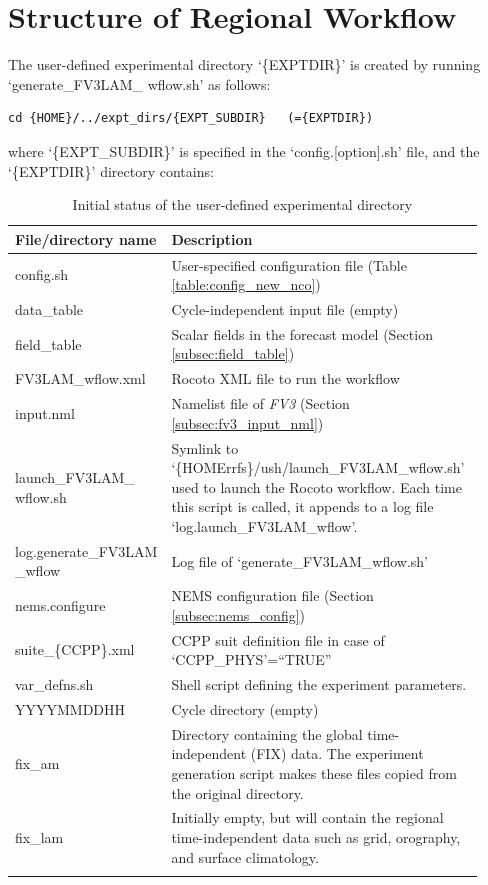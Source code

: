 \documentclass[11pt,fleqn]{report}              %
\begin{document}
\section{Structure of Regional Workflow}
\label{sec:workflow_exp_fix_dir}

The user-defined experimental directory `\{EXPTDIR\}' is created by running `generate\_FV3LAM\_ wflow.sh' as follows:
\lstset{language=bash}   
\begin{lstlisting}[frame=trBL]
cd {HOME}/../expt_dirs/{EXPT_SUBDIR}   (={EXPTDIR})
\end{lstlisting}
where `\{EXPT\_SUBDIR\}' is specified in the `config.[option].sh' file, and the `\{EXPTDIR\}' directory contains:
{
\fontsize{10}{12}\selectfont
\begin{longtable}{p{0.21\linewidth} | p{0.72\linewidth} }
\hline
\hline
 File/directory name & Description \\
\hline
 config.sh & User-specified configuration file (Table \ref{table:config_new_nco})  \\
 data\_table & Cycle-independent input file (empty) \\
 field\_table & Scalar fields in the forecast model (Section \ref{subsec:field_table}) \\
 FV3LAM\_wflow.xml & Rocoto XML file to run the workflow \\
 input.nml & Namelist file of {\it FV3} (Section \ref{subsec:fv3_input_nml}) \\
 launch\_FV3LAM\_ wflow.sh & Symlink to `\{HOMErrfs\}/ush/launch\_FV3LAM\_wflow.sh' used to launch the Rocoto workflow. Each time this script is called, it appends to a log file `log.launch\_FV3LAM\_wflow'. \\
 log.generate\_FV3LAM \_wflow & Log file of `generate\_FV3LAM\_wflow.sh' \\
 nems.configure & NEMS configuration file (Section \ref{subsec:nems_config}) \\
 suite\_\{CCPP\}.xml & CCPP suit definition file in case of `CCPP\_PHYS'=``TRUE'' \\
 var\_defns.sh & Shell script defining the experiment parameters. \\
\hdashline
 YYYYMMDDHH & Cycle directory (empty) \\
 fix\_am & Directory containing the global time-independent (FIX) data. The experiment generation script makes these files copied from the original directory. \\
 fix\_lam & Initially empty, but will contain the regional time-independent data such as grid, orography, and surface climatology. \\
\hline
\caption{Initial status of the user-defined experimental directory}
\label{table:wflow_udef_dir}
\end{longtable}
}
\end{document}
